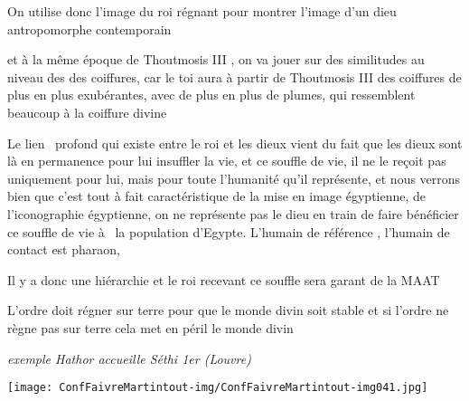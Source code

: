 \documentclass[a4paper]{article}
\begin{document}
{
On utilise donc l'image du roi régnant pour montrer l'image d'un dieu
antropomorphe contemporain}

{
et à la même époque de Thoutmosis III , on va jouer sur des similitudes
au niveau des des coiffures, car le toi aura à partir de Thoutmosis III
des coiffures de plus en plus exubérantes, avec de plus en plus de
plumes, qui ressemblent beaucoup à la coiffure divine}


\bigskip

{
Le lien \ profond qui existe entre le roi et les dieux vient du fait que
les dieux sont là en permanence pour lui insuffler la vie, et ce
souffle de vie, il ne le reçoit pas uniquement pour lui, mais pour
toute l'humanité qu'il représente, et nous verrons bien que c'est tout
à fait caractéristique de la mise en image égyptienne, de
l'iconographie égyptienne, on ne représente pas le dieu en train de
faire bénéficier ce souffle de vie à \ la population d'Egypte. L'humain
de référence , l'humain de contact est pharaon, }

{
Il y a donc une hiérarchie et le roi recevant ce souffle sera garant de
la MAAT}


\bigskip

{
L'ordre doit régner sur terre pour que le monde divin soit stable et si
l'ordre ne règne pas sur terre cela met en péril le monde divin}


\bigskip


\bigskip


\bigskip


\bigskip


\bigskip


\bigskip


\bigskip


\bigskip


\bigskip


\bigskip


\bigskip


\bigskip


\bigskip

{
\textit{exemple Hathor accueille Séthi 1er (Louvre)}}


\bigskip


\bigskip


\texttt{[image: ConfFaivreMartintout-img/ConfFaivreMartintout-img041.jpg]}
\end{document}
